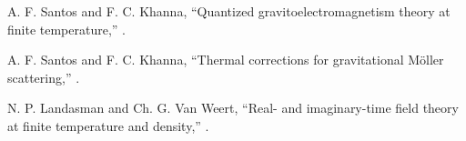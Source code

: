 \documentclass[11pt,showpacs,preprintnumbers,amsmath,amssymb,prd,nofootinbib,superscriptaddress]{revtex4-2}
\begin{document}
\begin{thebibliography}{99}
 A. F. Santos and F. C. Khanna, ``Quantized gravitoelectromagnetism theory at finite temperature,'' .

 A. F. Santos and F. C. Khanna, ``Thermal corrections for gravitational M{\"o}ller scattering,'' .

 N. P. Landasman and Ch. G. Van Weert, ``Real- and imaginary-time field theory at finite temperature and density,'' .

\end{thebibliography}
\end{document}
